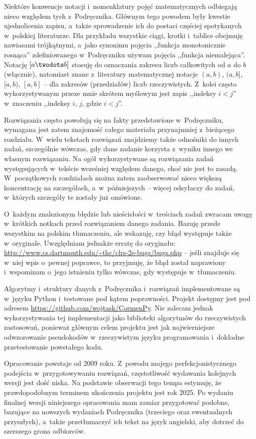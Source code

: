 Niektóre konwencje notacji i~nomenklatury pojęć matematycznych odbiegają nieco względem tych z~Podręcznika.
Głównym tego powodem były kwestie ujednolicenia zapisu, a~także sprowadzenie ich do postaci częściej spotykanych w~polskiej literaturze.
Dla przykładu wszystkie ciągi, krotki i~tablice obejmuję nawiasami trójkątnymi, a~jako synonimu pojęcia ,,funkcja monotonicznie rosnąca'' zdefiniowanego w~Podręczniku używam pojęcia ,,funkcja niemalejąca''.
Notację $[a\twodots b]$ stosuję do oznaczania zakresu liczb całkowitych od $a$ do $b$ (włącznie), natomiast znane z~literatury matematycznej notacje $(a,b)$, $(a,b]$, $[a,b)$, $[a,b]$ -- dla zakresów (przedziałów) liczb rzeczywistych.
Z~kolei często wykorzystywanym przeze mnie skrótem myślowym jest zapis ,,indeksy $i<j$'' w~znaczeniu ,,indeksy $i$, $j$, gdzie $i<j$''.

Rozwiązania często powołują się na fakty przedstawione w~Podręczniku, wymagana jest zatem znajomość całego materiału przynajmniej z~bieżącego rozdziału.
W~wielu tekstach rozwiązań znajdziemy także odnośniki do innych zadań, szczególnie wówczas, gdy dane zadanie korzysta z~wyniku innego we własnym rozwiązaniu.
Na ogół wykorzystywane są rozwiązania zadań występujących w~tekście wcześniej względem danego, choć nie jest to zasadą.
W~początkowych rozdziałach można zatem zaobserwować nieco większą koncentrację na szczegółach, a~w~późniejszych -- więcej odsyłaczy do zadań, w~których szczegóły te zostały już omówione.

O~każdym znalezionym błędzie lub nieścisłości w~treściach zadań zwracam uwagę w~krótkich notkach przed rozwiązaniem danego zadania.
Bazuję przede wszystkim na polskim tłumaczeniu, ale wskazuję, czy błąd występuje także w~oryginale.
Uwzględniam jednakże erratę do oryginału: \url{http://www.cs.dartmouth.edu/~thc/clrs-2e-bugs/bugs.php} -- jeśli znajduje się w~niej wpis o~pewnej poprawce, to przyjmuję, że błąd został naprawiony i~wspominam o~jego istnieniu tylko wówczas, gdy występuje w~tłumaczeniu.

Algorytmy i~struktury danych z~Podręcznika i~rozwiązań implementowane są w~języku Python i~testowane pod kątem poprawności.
Projekt dostępny jest pod adresem \url{https://github.com/wojtask/CormenPy}.
Nie zalecam jednak wykorzystywania tej implementacji jako biblioteki algorytmów do rzeczywistych zastosowań, ponieważ głównym celem projektu jest jak najwierniejsze odwzorowanie pseudokodów w~rzeczywistym języku programowania i~dokładne przetestowanie powstałego kodu.

Opracowanie powstaje od 2009 roku.
Z~powodu mojego perfekcjonistycznego podejścia w~przygotowywaniu rozwiązań, częstotliwość wydawania kolejnych wersji jest dość niska.
Na podstawie obserwacji tego tempa estymuję, że prawdopodobnym terminem ukończenia projektu jest rok 2025.
Po wydaniu finalnej wersji niniejszego opracowania mam zamiar przygotować podobne, bazujące na nowszych wydaniach Podręcznika (trzeciego \cite{cormen3} oraz ewentualnych przyszłych), a~także przetłumaczyć ich tekst na język angielski, aby dotrzeć do szerszego grona odbiorców.

